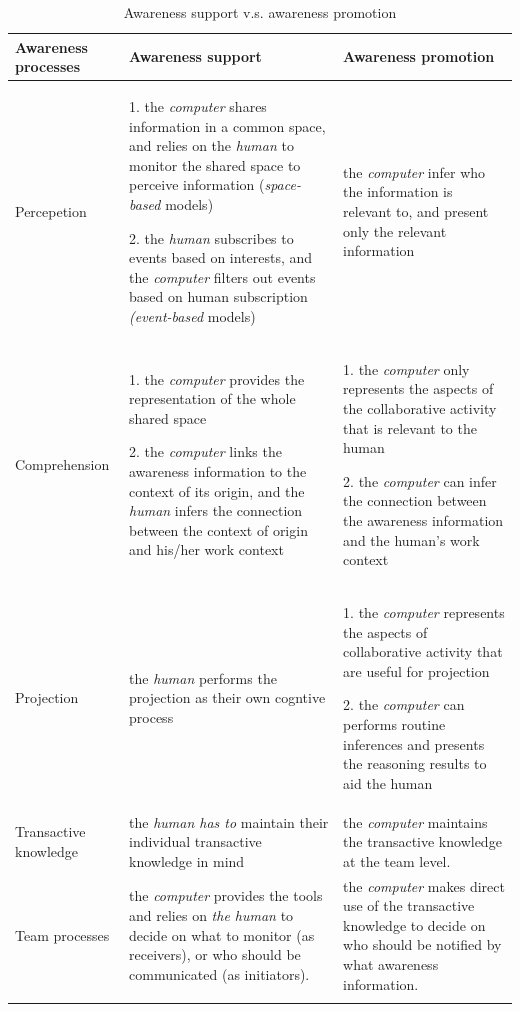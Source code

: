 {\footnotesize
   \begin{longtable}{>{\raggedright}p{1.1in}>{\raggedright}p{2.2in}>{\raggedright}p{2.2in}}
\toprule 
\textbf{Awareness processes} & \textbf{Awareness support} & \textbf{Awareness promotion}\tabularnewline
\midrule 
Percepetion & 1. the \emph{computer} shares information in a common space, and relies
on the \emph{human} to monitor the shared space to perceive information
(\emph{space-based} models)

2. the \emph{human} subscribes to events based on interests, and the
\emph{computer} filters out events based on human subscription\emph{
(event-based} models)  & the \emph{computer} infer who the information is relevant to, and
present only the relevant information\tabularnewline
\midrule 
Comprehension & 1. the \emph{computer} provides the representation of the whole shared
space

2. the \emph{computer} links the awareness information to the context
of its origin, and the \emph{human} infers the connection between
the context of origin and his/her work context & 1. the \emph{computer} only represents the aspects of the collaborative
activity that is relevant to the human

2. the \emph{computer} can infer the connection between the awareness
information and the human's work context\tabularnewline
\midrule 
Projection & the \emph{human} performs the projection as their own cogntive process & 1. the \emph{computer} represents the aspects of collaborative activity
that are useful for projection 

2. the \emph{computer} can performs routine inferences and presents
the reasoning results to aid the human\tabularnewline
\midrule 
Transactive knowledge & the \emph{human has to} maintain their individual transactive knowledge
in mind & the \emph{computer} maintains the transactive knowledge at the team
level.\tabularnewline
\midrule 
Team processes & the \emph{computer }provides the tools and relies on\emph{ the human}
to decide on what to monitor (as receivers), or who should be communicated
(as initiators). & the \emph{computer} makes direct use of the transactive knowledge
to decide on who should be notified by what awareness information.\tabularnewline
\bottomrule
\caption{Awareness support v.s. awareness promotion}
\label{tab:awareness_support_vs_promotion}
\end{longtable}
}

